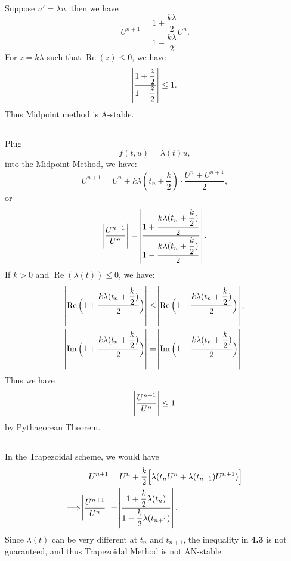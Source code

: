 \documentclass[11pt]{article}
\begin{document}
\subsection{}
Suppose $u'=\lambda u$, then we have
\begin{equation}
    U^{n+1} = \dfrac{1+\dfrac{k\lambda}2}{1-\dfrac{k\lambda}2}U^n.
\end{equation}
For $z=k\lambda$ such that $\operatorname{Re}(z)\leq0$, we have 
\begin{equation}
    \abs{\dfrac{1+\dfrac z2}{1-\dfrac z2}} \leq 1.
\end{equation}
Thus Midpoint method is A-stable.

\subsection{}
Plug
\begin{equation}
    f(t, u) = \lambda(t)u,
\nonumber\end{equation}
into the Midpoint Method, we have:
\begin{equation}
    U^{n+1} = U^n + k\lambda(t_n + \dfrac k2)\cdot\dfrac{U^n+U^{n+1}}2,
\nonumber\end{equation}
or
\begin{equation}
    \abs{\dfrac{U^{n+1}}{U^n}} =
    \abs{\dfrac{1+\dfrac{k\lambda(t_n+\dfrac k2)}2}{1-\dfrac{k\lambda(t_n+\dfrac k2)}2}}.
\end{equation}
If $k>0$ and $\operatorname{Re}(\lambda(t)) \leq 0$, we have:
\begin{equation}\begin{split}
    \abs{\operatorname{Re}\Big(1+\dfrac{k\lambda(t_n+\dfrac k2)}2\Big)}
    &\leq\abs{\operatorname{Re}\Big(1-\dfrac{k\lambda(t_n+\dfrac k2)}2\Big)},\\
    \abs{\operatorname{Im}\Big(1+\dfrac{k\lambda(t_n+\dfrac k2)}2\Big)}
    &=\abs{\operatorname{Im}\Big(1-\dfrac{k\lambda(t_n+\dfrac k2)}2\Big)}.
\end{split}\end{equation}
Thus we have
\begin{equation}
    \abs{\dfrac{U^{n+1}}{U^n}} \leq 1
\end{equation}
by Pythagorean Theorem.

\subsection{}
In the Trapezoidal scheme, we would have 
\begin{equation}\begin{split}
    U^{n+1} &= U^n + \dfrac k2 \Big[ \lambda(t_nU^n + \lambda(t_{n+1})U^{n+1})\Big]\\
    \Longrightarrow
    \abs{\dfrac{U^{n+1}}{U^n}} &= \abs{\dfrac{1+\dfrac k2\lambda(t_n)}
        {1-\dfrac k2 \lambda(t_{n+1})}}.
\end{split}\end{equation}
Since $\lambda(t)$ can be very different at $t_n$ and $t_{n+1}$, 
the inequality in \textbf{4.3} is not guaranteed, and thus Trapezoidal Method is not AN-stable.
\end{document}
